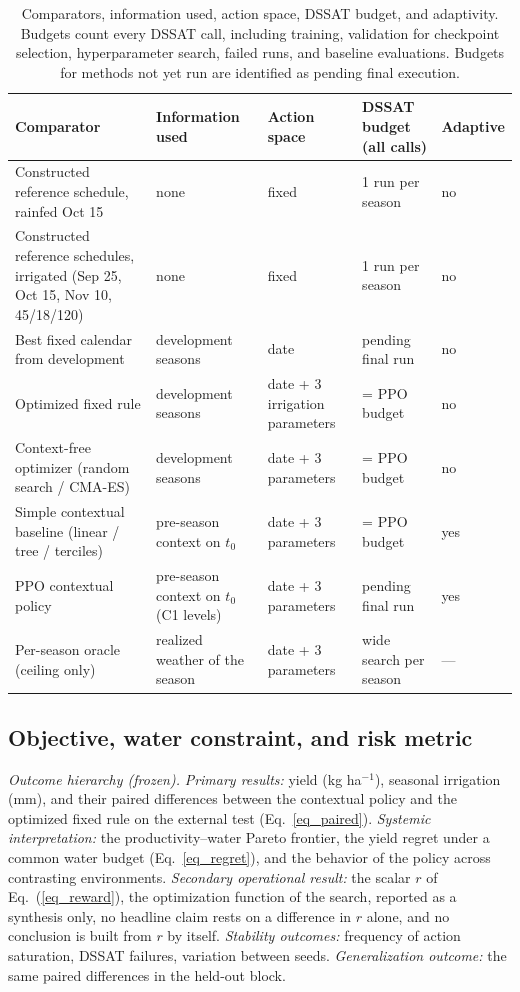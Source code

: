 \documentclass[times,final,authoryear]{elsarticle}
\begin{document}
\begin{table}[!h]
\centering
\footnotesize
\caption{Comparators, information used, action space, DSSAT budget, and adaptivity. Budgets count every DSSAT call, including training, validation for checkpoint selection, hyperparameter search, failed runs, and baseline evaluations. Budgets for methods not yet run are identified as pending final execution.}
\label{tab_design}
\begin{tabular}{p{3.5cm}p{3.0cm}p{2.5cm}p{2.3cm}p{1.6cm}}
\hline
Comparator & Information used & Action space & DSSAT budget (all calls) & Adaptive \\
\hline
Constructed reference schedule, rainfed Oct 15 & none & fixed & 1 run per season & no \\
Constructed reference schedules, irrigated (Sep 25, Oct 15, Nov 10, 45/18/120) & none & fixed & 1 run per season & no \\
Best fixed calendar from development & development seasons & date & pending final run & no \\
Optimized fixed rule & development seasons & date + 3 irrigation parameters & = PPO budget & no \\
Context-free optimizer (random search / CMA-ES) & development seasons & date + 3 parameters & = PPO budget & no \\
Simple contextual baseline (linear / tree / terciles) & pre-season context on $t_0$ & date + 3 parameters & = PPO budget & yes \\
PPO contextual policy & pre-season context on $t_0$ (C1 levels) & date + 3 parameters & pending final run & yes \\
Per-season oracle (ceiling only) & realized weather of the season & date + 3 parameters & wide search per season & --- \\
\hline
\end{tabular}
\end{table}


\subsection{Objective, water constraint, and risk metric}
\label{subobjective}

\emph{Outcome hierarchy (frozen).} \emph{Primary results:} yield (kg ha$^{-1}$), seasonal irrigation (mm), and their paired differences between the contextual policy and the optimized fixed rule on the external test (Eq.~\ref{eq_paired}). \emph{Systemic interpretation:} the productivity--water Pareto frontier, the yield regret under a common water budget (Eq.~\ref{eq_regret}), and the behavior of the policy across contrasting environments. \emph{Secondary operational result:} the scalar $r$ of Eq.~(\ref{eq_reward}), the optimization function of the search, reported as a synthesis only, no headline claim rests on a difference in $r$ alone, and no conclusion is built from $r$ by itself. \emph{Stability outcomes:} frequency of action saturation, DSSAT failures, variation between seeds. \emph{Generalization outcome:} the same paired differences in the held-out block.
\end{document}
